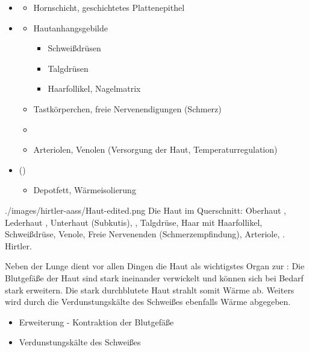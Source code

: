 {
\begin{itemize}
  \item {}  
  \begin{itemize}
    \item Hornschicht, geschichtetes Plattenepithel
  \end{itemize}
  \item {} 
  \begin{itemize}
    \item Hautanhangsgebilde
    \begin{itemize}
      \item Schweißdrüsen
      \item Talgdrüsen
      \item Haarfollikel, Nagelmatrix
    \end{itemize}
    \item Tastkörperchen, freie Nervenendigungen (Schmerz)
    \item {}
    \item Arteriolen, Venolen (Versorgung der Haut, Temperaturregulation)
  \end{itemize}
  \item {} () 
  \begin{itemize}
    \item Depotfett, Wärmeisolierung
  \end{itemize}
\end{itemize}
}
{./images/hirtler-aass/Haut-edited.png}
{Die Haut im Querschnitt:  Oberhaut ,
 Lederhaut ,
 Unterhaut (Subkutis),
 ,
 Talgdrüse,
 Haar mit Haarfollikel,
 Schweißdrüse,
 Venole,
 Freie Nervenenden (Schmerzempfindung),
 Arteriole,
 .
}
{Hirtler.}




{%
Neben der Lunge dient vor allen Dingen  die Haut als
wichtigstes Organ zur : Die Blutgefäße 
der  Haut sind stark ineinander verwickelt und können sich
bei Bedarf stark erweitern. Die stark durchblutete  Haut
strahlt somit Wärme ab. Weiters wird durch die
Verdunstungskälte  des Schweißes  ebenfalls Wärme abgegeben.
}
{
\begin{itemize}
  \item Erweiterung - Kontraktion der Blutgefäße
  \item Verdunstungskälte des Schweißes
\end{itemize}
}{}{}{}

